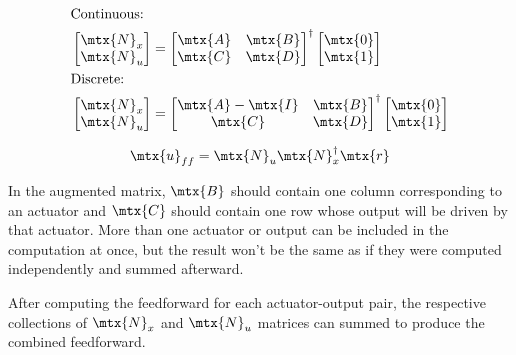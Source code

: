 \begin{theorem}
  \label{thm:steady-state_ff}

  \begin{align}
    &\text{Continuous:} \nonumber \\
    &\begin{bmatrix}
      \mtx{N}_x \\
      \mtx{N}_u
    \end{bmatrix} =
    \begin{bmatrix}
      \mtx{A} & \mtx{B} \\
      \mtx{C} & \mtx{D}
    \end{bmatrix}^{\dagger}
    \begin{bmatrix}
      \mtx{0} \\
      \mtx{1}
    \end{bmatrix} \\
    &\text{Discrete:} \nonumber \\
    &\begin{bmatrix}
      \mtx{N}_x \\
      \mtx{N}_u
    \end{bmatrix} =
    \begin{bmatrix}
      \mtx{A} - \mtx{I} & \mtx{B} \\
      \mtx{C} & \mtx{D}
    \end{bmatrix}^{\dagger}
    \begin{bmatrix}
      \mtx{0} \\
      \mtx{1}
    \end{bmatrix}
  \end{align}

  \begin{equation}
    \mtx{u}_{ff} = \mtx{N}_u \mtx{N}_x^\dagger \mtx{r}
  \end{equation}

  In the augmented matrix, $\mtx{B}$ should contain one column corresponding to
  an actuator and $\mtx{C}$ should contain one row whose \gls{output} will be
  driven by that actuator. More than one actuator or output can be included in
  the computation at once, but the result won't be the same as if they were
  computed independently and summed afterward.

  After computing the feedforward for each actuator-output pair, the respective
  collections of $\mtx{N}_x$ and $\mtx{N}_u$ matrices can summed to produce the
  combined feedforward.
\end{theorem}

